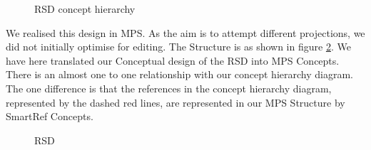 \begin{figure}
    \centering
    \caption{RSD concept hierarchy}
    \label{fig:RSDDiagram}
\end{figure}

We realised this design in MPS.
As the aim is to attempt different projections, we did not initially optimise for editing.
The Structure is as shown in figure \ref{fig:RSDStructure}.
We have here translated our Conceptual design of the RSD into MPS Concepts.
There is an almost one to one relationship with our concept hierarchy diagram.
The one difference is that the references in the concept hierarchy diagram, represented by the dashed red lines, are represented in our MPS Structure by SmartRef Concepts.

\begin{figure}[h]
    \centering
    \caption{RSD}
    \label{fig:RSDStructure}
\end{figure}

